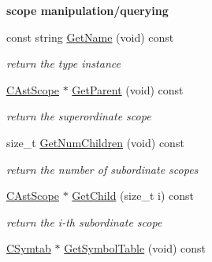 \begin{Indent}{\bf scope manipulation/querying}\par
\begin{DoxyCompactItemize}
\item 
\hypertarget{classCAstScope_ad6a03fe4b98d6852ffbbdb4271216205}{const string \hyperlink{classCAstScope_ad6a03fe4b98d6852ffbbdb4271216205}{Get\-Name} (void) const }\label{classCAstScope_ad6a03fe4b98d6852ffbbdb4271216205}

\begin{DoxyCompactList}\small\item\em return the type instance \end{DoxyCompactList}\item 
\hypertarget{classCAstScope_afd1735b3ccaf77a313b35101eb39081f}{\hyperlink{classCAstScope}{C\-Ast\-Scope} $\ast$ \hyperlink{classCAstScope_afd1735b3ccaf77a313b35101eb39081f}{Get\-Parent} (void) const }\label{classCAstScope_afd1735b3ccaf77a313b35101eb39081f}

\begin{DoxyCompactList}\small\item\em return the superordinate scope \end{DoxyCompactList}\item 
\hypertarget{classCAstScope_a761e3854ca888550e167b497d72b45f4}{size\-\_\-t \hyperlink{classCAstScope_a761e3854ca888550e167b497d72b45f4}{Get\-Num\-Children} (void) const }\label{classCAstScope_a761e3854ca888550e167b497d72b45f4}

\begin{DoxyCompactList}\small\item\em return the number of subordinate scopes \end{DoxyCompactList}\item 
\hypertarget{classCAstScope_a8c11f3cad20a4e0c88e00737f044eacd}{\hyperlink{classCAstScope}{C\-Ast\-Scope} $\ast$ \hyperlink{classCAstScope_a8c11f3cad20a4e0c88e00737f044eacd}{Get\-Child} (size\-\_\-t i) const }\label{classCAstScope_a8c11f3cad20a4e0c88e00737f044eacd}

\begin{DoxyCompactList}\small\item\em return the {\itshape i-\/th} subordinate scope \end{DoxyCompactList}\item 
\hypertarget{classCAstScope_a08545144d36fbbe9c04420c4c9a5c6f2}{\hyperlink{classCSymtab}{C\-Symtab} $\ast$ \hyperlink{classCAstScope_a08545144d36fbbe9c04420c4c9a5c6f2}{Get\-Symbol\-Table} (void) const }\label{classCAstScope_a08545144d36fbbe9c04420c4c9a5c6f2}


\end{DoxyCompactItemize}
\end{Indent}
